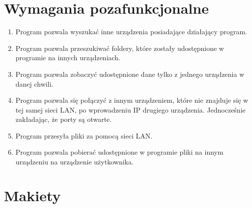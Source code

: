 \documentclass[12pt,a4paper]{article}
\begin{document}
\section{Wymagania pozafunkcjonalne}

\begin{enumerate}
	\item Program pozwala wyszukać inne urządzenia posiadające działający program.
	\item Program pozwala przeszukiwać foldery, które zostały udostępnione w programie na innych urządzeniach.
	\item Program pozwala zobaczyć udostępnione dane tylko z jednego urządzenia w danej chwili.
	\item Program pozwala się połączyć z innym urządzeniem, które nie znajduje się w tej samej sieci LAN, po wprowadzeniu IP drugiego urządzenia. Jednocześnie zakładając, że porty są otwarte.
	\item Program przesyła pliki za pomocą sieci LAN.
	\item Program pozwala pobierać udostępnione w programie pliki na innym urządzeniu na urządzenie użytkownika.
	

\end{enumerate}

\section{Makiety}
\end{document}
